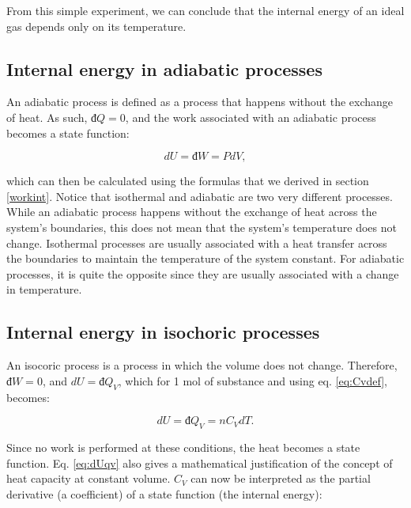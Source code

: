 \documentclass[
]{book}
\theoremstyle{definition}
\theoremstyle{definition}
\theoremstyle{definition}
\theoremstyle{remark}
\begin{document}
From this simple experiment, we can conclude that the internal energy of an ideal gas depends only on its temperature.

\hypertarget{internal-energy-in-adiabatic-processes}{%
\subsection{Internal energy in adiabatic processes}\label{internal-energy-in-adiabatic-processes}}

An adiabatic process is defined as a process that happens without the exchange of heat. As such, \(đ Q=0\), and the work associated with an adiabatic process becomes a state function:

\begin{equation}
  dU=đ W=PdV,
  \label{eq:dUadiabatic}
\end{equation}

which can then be calculated using the formulas that we derived in section \ref{workint}. Notice that isothermal and adiabatic are two very different processes. While an adiabatic process happens without the exchange of heat across the system's boundaries, this does not mean that the system's temperature does not change. Isothermal processes are usually associated with a heat transfer across the boundaries to maintain the temperature of the system constant. For adiabatic processes, it is quite the opposite since they are usually associated with a change in temperature.

\hypertarget{internal-energy-in-isochoric-processes}{%
\subsection{Internal energy in isochoric processes}\label{internal-energy-in-isochoric-processes}}

An isocoric process is a process in which the volume does not change. Therefore, \(đ W=0\), and \(dU = đ Q_V\), which for 1 mol of substance and using eq. \eqref{eq:Cvdef}, becomes:

\begin{equation}
  dU = đ Q_V = n C_V dT.
  \label{eq:dUqv}
\end{equation}

Since no work is performed at these conditions, the heat becomes a state function. Eq. \eqref{eq:dUqv} also gives a mathematical justification of the concept of heat capacity at constant volume. \(C_V\) can now be interpreted as the partial derivative (a coefficient) of a state function (the internal energy):
\end{document}

